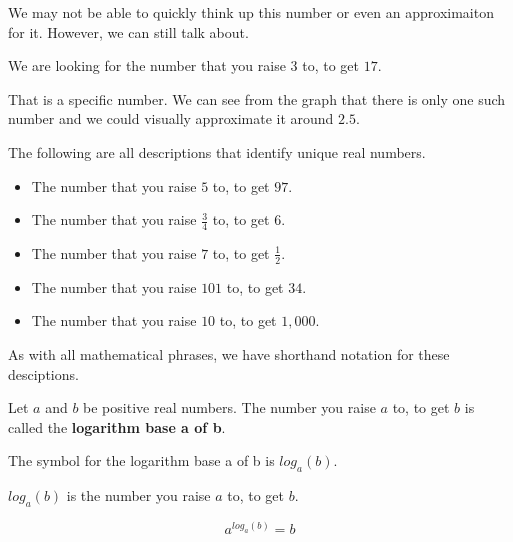\documentclass{ximera}
\begin{document}
We may not be able to quickly think up this number or even an approximaiton for it.  However, we can still talk about.

\begin{center}
We are looking for the number that you raise $3$ to, to get $17$.
\end{center}


That is a specific number. We can see from the graph that there is only one such number and we could visually approximate it around $2.5$.


\begin{example}
The following are all descriptions that identify unique real numbers.

\begin{itemize}
\item The number that you raise $5$ to, to get $97$.
\item The number that you raise $\frac{3}{4}$ to, to get $6$.
\item The number that you raise $7$ to, to get $\frac{1}{2}$.
\item The number that you raise $101$ to, to get $34$.
\item The number that you raise $10$ to, to get $1,000$.
\end{itemize}

\end{example}



As with all mathematical phrases, we have shorthand notation for these desciptions.








\begin{definition}

Let $a$ and $b$ be positive real numbers.  The number  you raise $a$ to, to get $b$ is called the \textbf{logarithm base a of b}.

The symbol for the logarithm base a of b is $log_a(b)$.


$log_a(b)$ is  the number you raise $a$ to, to get $b$.

\[     a^{log_a(b)} = b          \]




\end{definition}
\end{document}
